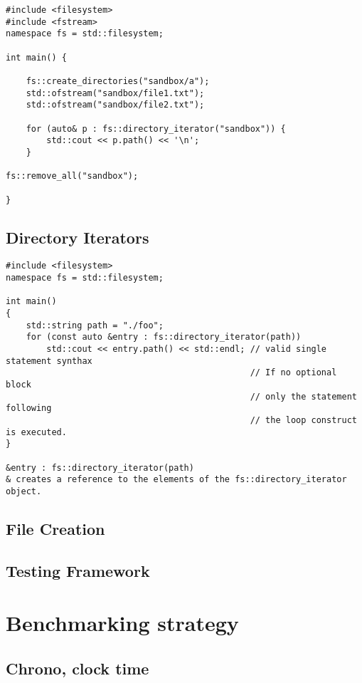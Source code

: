 \begin{verbatim}
#include <filesystem>
#include <fstream>
namespace fs = std::filesystem;

int main() {

    fs::create_directories("sandbox/a");
    std::ofstream("sandbox/file1.txt");
    std::ofstream("sandbox/file2.txt");

    for (auto& p : fs::directory_iterator("sandbox")) {
        std::cout << p.path() << '\n';
    } 

fs::remove_all("sandbox");

}
\end{verbatim}

\subsection{Directory Iterators}

\begin{verbatim}
#include <filesystem>
namespace fs = std::filesystem;

int main()
{
    std::string path = "./foo";
    for (const auto &entry : fs::directory_iterator(path))
        std::cout << entry.path() << std::endl; // valid single statement synthax
                                                // If no optional block
                                                // only the statement following
                                                // the loop construct is executed.
}

&entry : fs::directory_iterator(path)
& creates a reference to the elements of the fs::directory_iterator object.
\end{verbatim}

\subsection{File Creation}


\subsection{Testing Framework}

\section{Benchmarking strategy}
\subsection{Chrono, clock time}

